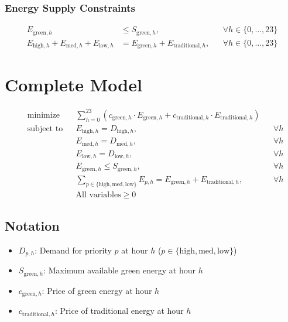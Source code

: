 \documentclass{article}
\begin{document}
\subsubsection{Energy Supply Constraints}
\begin{align*}
E_{\text{green},h} &\leq S_{\text{green},h}, && \forall h \in \{0,\ldots,23\} \\
E_{\text{high},h} + E_{\text{med},h} + E_{\text{low},h} &= E_{\text{green},h} + E_{\text{traditional},h}, && \forall h \in \{0,\ldots,23\}
\end{align*}

\section{Complete Model}
$$
\begin{aligned}
& \text{minimize} && \sum_{h=0}^{23} \left( c_{\text{green},h} \cdot E_{\text{green},h} + c_{\text{traditional},h} \cdot E_{\text{traditional},h} \right) \\
& \text{subject to} && E_{\text{high},h} = D_{\text{high},h}, && \forall h \\
& && E_{\text{med},h} = D_{\text{med},h}, && \forall h \\
& && E_{\text{low},h} = D_{\text{low},h}, && \forall h \\
& && E_{\text{green},h} \leq S_{\text{green},h}, && \forall h \\
& && \sum_{p \in \{\text{high},\text{med},\text{low}\}} E_{p,h} = E_{\text{green},h} + E_{\text{traditional},h}, && \forall h \\
& && \text{All variables} \geq 0
\end{aligned}
$$

\subsection{Notation}
\begin{itemize}
\item $D_{p,h}$: Demand for priority $p$ at hour $h$ ($p \in \{\text{high},\text{med},\text{low}\}$)
\item $S_{\text{green},h}$: Maximum available green energy at hour $h$
\item $c_{\text{green},h}$: Price of green energy at hour $h$
\item $c_{\text{traditional},h}$: Price of traditional energy at hour $h$
\end{itemize}
\end{document}
